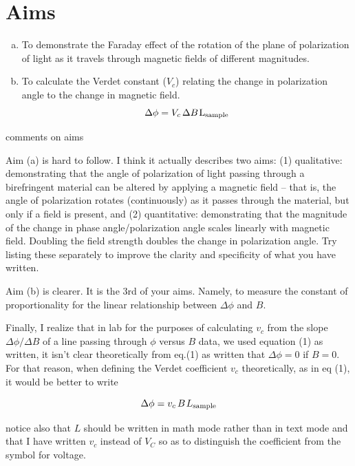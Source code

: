 \documentclass[prb,preprint]{revtex4-1}
\begin{document}
\maketitle 
\section{Aims}
{
\begin{enumerate}[(a)]
\item To demonstrate the Faraday effect of the rotation of the plane of polarization of light as it travels through magnetic fields of different magnitudes.

\item To calculate the Verdet constant ($V_{c}$) relating the change in polarization angle to the change in magnetic field.
\begin{equation}
\label{vconst}
\Delta \phi =V_{c}\hspace{1.5pt} \Delta B\hspace{1pt}\textrm{L}{_{\textrm{sample}}}
\end{equation}
\end{enumerate}
}
{\color{blue} comments on aims 

Aim (a) is hard to follow. I think it actually describes two aims: (1) qualitative: demonstrating that the angle of polarization of light passing through a birefringent material can be altered by applying a magnetic field -- that is, the angle of polarization rotates (continuously) as it passes through the material, but only if a field is present, and (2) quantitative: demonstrating that the magnitude of the change in phase angle/polarization angle scales linearly with magnetic field. Doubling the field strength doubles the change in polarization angle.   Try listing these separately to improve the clarity and specificity of what you have written. 

Aim (b) is clearer. It is the 3rd of your aims. Namely, to measure the constant of proportionality for the linear relationship between $\Delta\phi$ and $B$. 

Finally, I realize that in lab for the purposes of calculating $v_c$ from the slope $\Delta\phi/\Delta B$ of a line passing through $\phi$ versus $B$ data, we used equation (1) as written, it isn't clear theoretically from eq.(1) as written  that $\Delta\phi = 0$ if $B = 0$.   For that reason, when defining the Verdet coefficient $v_c$ theoretically, as in eq (1), it would be better to write

\begin{equation*}
\label{vconst}
\Delta \phi =v_{c}\hspace{1.5pt} B\hspace{1pt}{L}{_{\textrm{sample}}}
\end{equation*}

notice also that $L$ should be written in math mode rather than in text mode and that I have written $v_c$ instead of $V_C$ so as to distinguish the coefficient from the symbol for voltage. 

}
\end{document}
